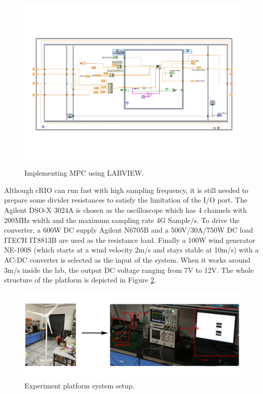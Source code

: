\documentclass[journal]{IEEEtran}
\begin{document}
\begin{figure}
	\begin{center}
		\includegraphics[width=5.5in]{picture/2.jpg}
		\caption{Implementing MPC using LABVIEW.}\label{fig:labv1}
	\end{center}
\end{figure}

Although cRIO can run fast with high sampling frequency, it is still needed to prepare some divider resistances to satisfy the limitation of the I/O port. The Agilent DSO-X 3024A is chosen as the oscilloscope which has 4 channels with 200MHz width and the maximum sampling rate 4G Sample/s. To drive the converter, a 600W DC supply Agilent N6705B and a 500V/30A/750W DC load ITECH IT8813B are used as the resistance load. Finally a 100W wind generator NE-100S (which starts at a wind velocity 2m/s and stays stable at 10m/s) with a AC-DC converter is selected as the input of the system. When it  works around 3m/s inside the lab, the output DC voltage ranging from 7V to 12V. The whole structure of the platform is depicted in Figure \ref{fig:structure}.
\begin{figure}
	\begin{center}
		\includegraphics[width=5.5in]{picture/3.jpg}
		\caption{Experiment platform system setup.}\label{fig:structure}
	\end{center}
\end{figure}
\end{document}

